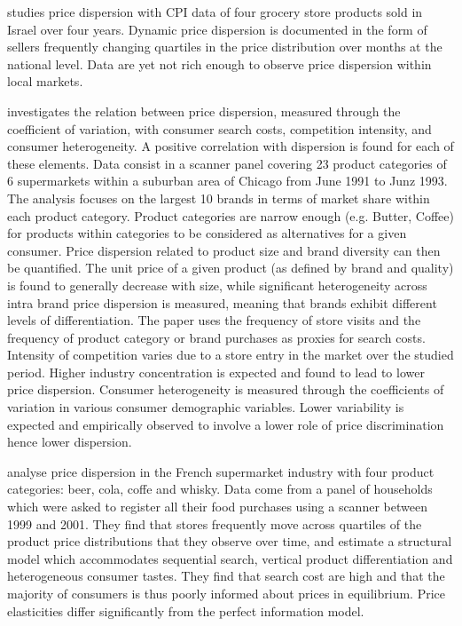 \documentclass[english]{article}
\begin{document}
\cite{LAC02} studies price dispersion with CPI data of four grocery store products sold in Israel over four years. Dynamic price dispersion is documented in the form of sellers frequently changing quartiles in the price distribution over months at the national level. Data are yet not rich enough to observe price dispersion within local markets.

\cite{ZHA06} investigates the relation between price dispersion, measured through the coefficient of variation, with consumer search costs, competition intensity, and consumer heterogeneity. A positive correlation with dispersion is found for each of these elements. Data consist in a scanner panel covering 23 product categories of 6 supermarkets within a suburban area of Chicago from June 1991 to Junz 1993. The analysis focuses on the largest 10 brands in terms of market share within each product category. Product categories are narrow enough (e.g. Butter, Coffee) for products within categories to be considered as alternatives for a given consumer. Price dispersion related to product size and brand diversity can then be quantified. The unit price of a given product (as defined by brand and quality) is found to generally decrease with size, while significant heterogeneity across intra brand price dispersion is measured, meaning that brands exhibit different levels of differentiation. The paper uses the frequency of store visits and the frequency of product category or brand purchases as proxies for search costs. Intensity of competition varies due to a store entry in the market over the studied period. Higher industry concentration is expected and found to lead to lower price dispersion. Consumer heterogeneity is measured through the coefficients of variation in various consumer demographic variables. Lower variability is expected and empirically observed to involve a lower role of price discrimination hence lower dispersion.

\cite{PER15} analyse price dispersion in the French supermarket industry with four product categories: beer, cola, coffe and whisky. Data come from a panel of households which were asked to register all their food purchases using a scanner between 1999 and 2001. They find that stores frequently move across quartiles of the product price distributions that they observe over time, and estimate a structural model which accommodates sequential search, vertical product differentiation and heterogeneous consumer tastes. They find that search cost are high and that the majority of consumers is thus poorly informed about prices in equilibrium. Price elasticities differ significantly from the perfect information model.
\end{document}
